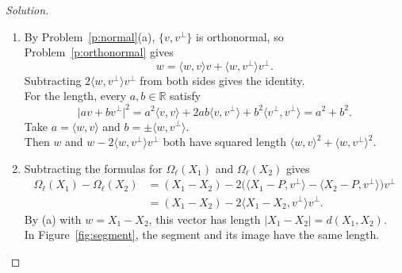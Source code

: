 \documentclass[11pt,a4paper]{article}
\theoremstyle{boxed}
\theoremstyle{definition}
\newenvironment{solution}{\begin{proof}[Solution]}{\end{proof}}
\newenvironment{plate}{\par\medskip\noindent\begin{minipage}{\linewidth}\centering}{\end{minipage}\par\medskip}
\newcommand{\R}{\mathbb{R}}
\newcommand{\ip}[2]{\langle #1, #2 \rangle}
\newcommand{\abs}[1]{\lvert #1 \rvert}
\newcommand{\eqtick}[2]{\draw ($(#1)!0.5!(#2)!1.2mm!90:(#2)$) -- ($(#1)!0.5!(#2)!1.2mm!-90:(#2)$);}
\begin{document}
\begin{solution}
\leavevmode
\begin{enumerate}
    \item By Problem~\ref{p:normal}(a), $\{v,v^\perp\}$ is orthonormal, so Problem~\ref{p:orthonormal} gives
    \[
    w=\ip{w}{v}v+\ip{w}{v^\perp}v^\perp.
    \]
    Subtracting $2\ip{w}{v^\perp}v^\perp$ from both sides gives the identity.\\
    For the length, every $a,b\in\R$ satisfy
    \[
    \abs{av+bv^\perp}^2=a^2\ip{v}{v}+2ab\ip{v}{v^\perp}+b^2\ip{v^\perp}{v^\perp}=a^2+b^2.
    \]
    Take $a=\ip{w}{v}$ and $b=\pm\ip{w}{v^\perp}$.\\
    Then $w$ and $w-2\ip{w}{v^\perp}v^\perp$ both have squared length $\ip{w}{v}^2+\ip{w}{v^\perp}^2$.
    \item Subtracting the formulas for $\Omega_\ell(X_1)$ and $\Omega_\ell(X_2)$ gives
    \begin{align*}
    \Omega_\ell(X_1)-\Omega_\ell(X_2)
    &=(X_1-X_2)-2\bigl(\ip{X_1-P}{v^\perp}-\ip{X_2-P}{v^\perp}\bigr)v^\perp\\
    &=(X_1-X_2)-2\ip{X_1-X_2}{v^\perp}v^\perp.
    \end{align*}
    By (a) with $w=X_1-X_2$, this vector has length $\abs{X_1-X_2}=d(X_1,X_2)$.\\
    In Figure~\ref{fig:segment}, the segment and its image have the same length. \qedhere
\end{enumerate}
\end{solution}

\begin{plate}
\label{fig:segment}
\end{plate}
\end{document}
